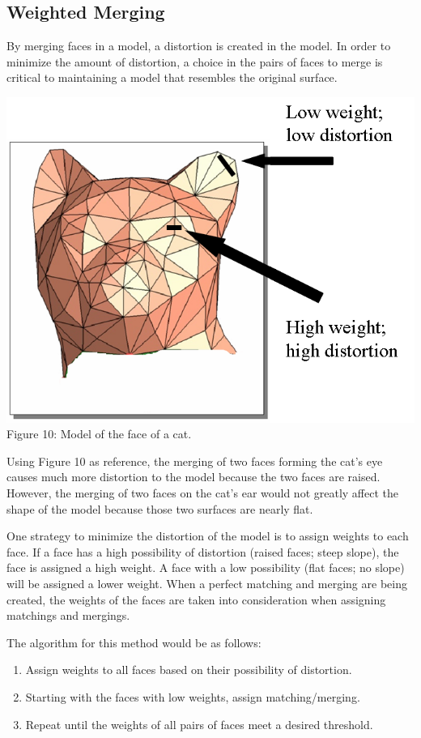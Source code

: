 \documentclass[12pt]{article}
\begin{document}
\begin{flushleft}
\newpage
\subsection*{Weighted Merging}
By merging faces in a model, a distortion is created in the model. In order to minimize the amount of distortion, a choice in the pairs of faces to merge is critical to maintaining a model that resembles the original surface.

\begin{center}
\includegraphics[scale=0.5]{images/distortion.png}\\
Figure 10: Model of the face of a cat.
\end{center}

\medskip
Using Figure 10 as reference, the merging of two faces forming the cat's eye causes much more distortion to the model because the two faces are raised. However, the merging of two faces on the cat's ear would not greatly affect the shape of the model because those two surfaces are nearly flat.

\medskip
One strategy to minimize the distortion of the model is to assign weights to each face. If a face has a high possibility of distortion (raised faces; steep slope), the face is assigned a high weight. A face with a low possibility (flat faces; no slope) will be assigned a lower weight. When a perfect matching and merging are being created, the weights of the faces are taken into consideration when assigning matchings and mergings.

\medskip
The algorithm for this method would be as follows:
\begin{enumerate}
\item Assign weights to all faces based on their possibility of distortion.
\item Starting with the faces with low weights, assign matching/merging.
\item Repeat until the weights of all pairs of faces meet a desired threshold.
\end{enumerate}


\end{flushleft}
\end{document}
